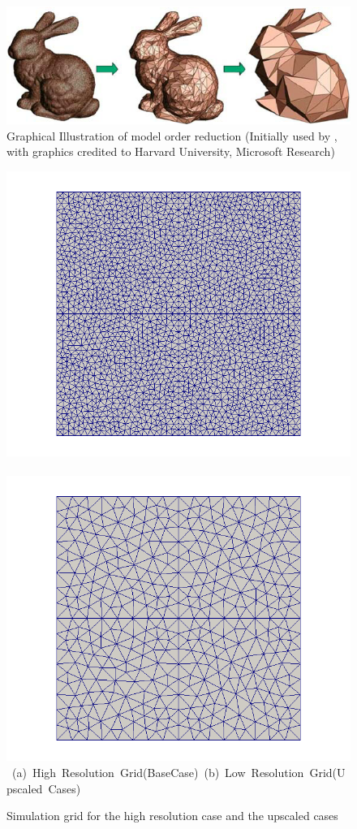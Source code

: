 

\begin{figure}[ht] 
\vbox{\vspace{-1cm}
\centering
\includegraphics[width=.56\textwidth]{./Pics/Introduction/Graphical-illustration-of-model-order-reduction.png}
\vspace{0.cm}
\vspace{0.5cm}
}   
\caption{Graphical Illustration of model order reduction (Initially used by \citet{Schilders2008}, with graphics credited to Harvard University, Microsoft Research)}
\vspace{1.5cm}
\label{fig:IllustrationMOR}
\end{figure}

\begin{figure}[ht] 
\vbox{\vspace{-1cm}
\hbox{\includegraphics[width=.56\textwidth]{./Pics/BaseCase/BaseCase_MeshOnly.png}
      \includegraphics[width=.56\textwidth]{./Pics/ArithMeanCase/ArithMeanCase_MeshOnly.png}}
\vspace{0.cm}
\hbox{\hspace{0.25cm} (a) High Resolution Grid(BaseCase) \hspace{0.75cm} (b) Low Resolution Grid(Upscaled Cases) \hspace{3.0cm}}
\vspace{0.5cm}
}   
\caption{Simulation grid for the high resolution case and the upscaled cases}
\label{fig:HiRes_LowRes_Mesh}
\end{figure}


